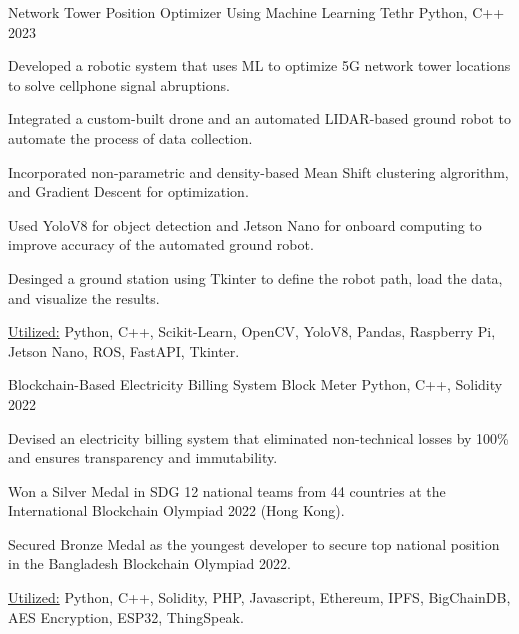

\begin{cventries}

  \cventryprojects
    {Network Tower Position Optimizer Using Machine Learning} %
    {Tethr} %
    {Python, C++} %
    {2023} %
    {
      \begin{cvitems} %
        \item {Developed a robotic system that uses ML to optimize 5G network tower locations 
        to solve cellphone signal abruptions.}
        \item {Integrated a custom-built drone and an automated LIDAR-based ground robot to automate the process of 
        data collection.}
        \item {Incorporated non-parametric and density-based Mean Shift clustering algrorithm, and Gradient Descent 
        for optimization.}
        \item {Used YoloV8 for object detection and Jetson Nano for onboard computing to improve accuracy of the automated 
        ground robot.}
        \item {Desinged a ground station using Tkinter to define the robot path, load the data, and visualize the results.}
        \item {\underline{Utilized:} Python, C++, Scikit-Learn, OpenCV, YoloV8, Pandas, Raspberry Pi, Jetson Nano, ROS, FastAPI, Tkinter.}
      \end{cvitems}
      }
      
      \cventryprojects
      {Blockchain-Based Electricity Billing System } %
      {Block Meter} %
      {Python, C++, Solidity} %
      {2022} %
      {
        \begin{cvitems} %
          \item {Devised an electricity billing system that eliminated non-technical losses by 100\% and ensures transparency and immutability.}
          \item {Won a Silver Medal in SDG 12 national teams from 44 countries at the International Blockchain Olympiad 2022 (Hong Kong).}
          \item {Secured Bronze Medal as the youngest developer to secure top national position in the Bangladesh Blockchain Olympiad 2022.}
          \item {\underline{Utilized:} Python, C++, Solidity, PHP, Javascript, Ethereum, IPFS, BigChainDB, AES Encryption, ESP32, ThingSpeak.}
        \end{cvitems}
        }
               

\end{cventries}
